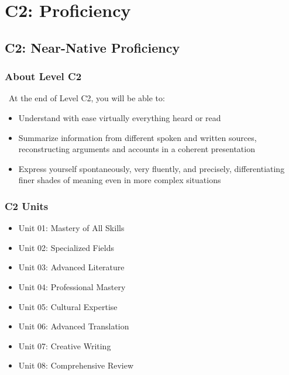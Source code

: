
\part{C2: Proficiency}
\label{part:c2}

\chapter{C2: Near-Native Proficiency}
\label{chap:c2}

\section*{About Level C2}

\levelCtwo\ At the end of Level C2, you will be able to:

\begin{itemize}
\item Understand with ease virtually everything heard or read
\item Summarize information from different spoken and written sources, reconstructing arguments and accounts in a coherent presentation
\item Express yourself spontaneously, very fluently, and precisely, differentiating finer shades of meaning even in more complex situations
\end{itemize}

\section*{C2 Units}
\begin{itemize}
\item Unit 01: Mastery of All Skills
\item Unit 02: Specialized Fields
\item Unit 03: Advanced Literature
\item Unit 04: Professional Mastery
\item Unit 05: Cultural Expertise
\item Unit 06: Advanced Translation
\item Unit 07: Creative Writing
\item Unit 08: Comprehensive Review
\end{itemize}

